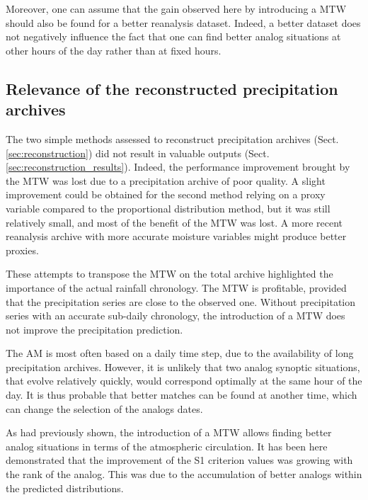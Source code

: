\documentclass[hess, manuscript]{copernicus}
\begin{document}
Moreover, one can assume that the gain observed here by introducing a MTW should also be found for a better reanalysis dataset. Indeed, a better dataset does not negatively influence the fact that one can find better analog situations at other hours of the day rather than at fixed hours.


\subsection{Relevance of the reconstructed precipitation archives}

The two simple methods assessed to reconstruct precipitation archives (Sect. \ref{sec:reconstruction}) did not result in valuable outputs (Sect. \ref{sec:reconstruction_results}). Indeed, the performance improvement brought by the MTW was lost due to a precipitation archive of poor quality. A slight improvement could be obtained for the second method relying on a proxy variable compared to the proportional distribution method, but it was still relatively small, and most of the benefit of the MTW was lost. A more recent reanalysis archive with more accurate moisture variables might produce better proxies.

These attempts to transpose the MTW on the total archive highlighted the importance of the actual rainfall chronology. The MTW is profitable, provided that the precipitation series are close to the observed one. Without precipitation series with an accurate sub-daily chronology, the introduction of a MTW does not improve the precipitation prediction.



\conclusions  %

The AM is most often based on a daily time step, due to the availability of long precipitation archives. However, it is unlikely that two analog synoptic situations, that evolve relatively quickly, would correspond optimally at the same hour of the day. It is thus probable that better matches can be found at another time, which can change the selection of the analogs dates.

As \citet{Finet2008} had previously shown, the introduction of a MTW allows finding better analog situations in terms of the atmospheric circulation. It has been here demonstrated that the improvement of the S1 criterion values was growing with the rank of the analog. This was due to the accumulation of better analogs within the predicted distributions.
\end{document}
